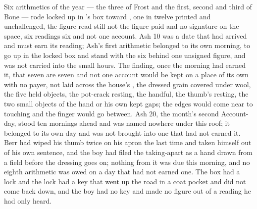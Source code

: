 Six arithmetics of the year --- the three of Frost and the first, second and third of Bone --- rode locked up  in 's box toward , one in twelve printed and unchallenged, the figure read still not the figure paid and no signature on the space, six readings six and not one account. Ash 10 was a date that had arrived and must earn its reading; Ash's first arithmetic belonged to its own morning, to go up in the locked box and stand with the six behind one unsigned figure, and was not carried into the small hours. The finding, once the morning had earned it, that seven are seven and not one account would be kept on a place of its own with no payer, not laid across the house's , the dressed grain covered under wool, the five held objects, the pot-crack resting, the handful, the thumb's resting, the two small objects of the hand or his own kept gaps; the edges would come near to touching and the finger would go between. Ash 20, the month's second Account-day, stood ten mornings ahead and was named nowhere under this roof; it belonged to its own day and was not brought into one that had not earned it. Berr had wiped his thumb twice on his apron the last time and taken himself out of his own sentence, and the boy had filed the taking-apart as a hand drawn from a field before the dressing goes on; nothing from it was due this morning, and no eighth arithmetic was owed on a day that had not earned one. The box had a lock and the lock had a key that went up the road in a coat pocket and did not come back down, and the boy had no key and made no figure out of a reading he had only heard.

